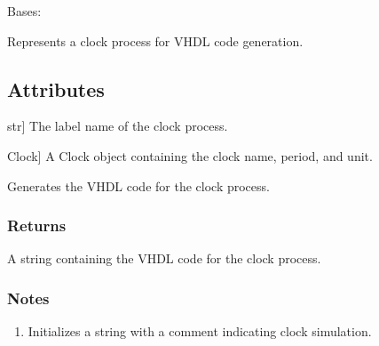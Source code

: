 \documentclass[letterpaper,10pt,english]{sphinxmanual}
\begin{document}
\begin{fulllineitems}
\label{\detokenize{process:process.Clock_Process}}
\pysigstartsignatures
{}
\pysigstopsignatures
\sphinxAtStartPar
Bases: {\hyperref[\detokenize{process:process.Process}]{}}

\sphinxAtStartPar
Represents a clock process for VHDL code generation.


\subsection{Attributes}
\label{\detokenize{process:attributes}}\begin{description}
\sphinxlineitem{label}{[}str{]}
\sphinxAtStartPar
The label name of the clock process.

\sphinxlineitem{clock}{[}Clock{]}
\sphinxAtStartPar
A Clock object containing the clock name, period, and unit.

\end{description}

\begin{fulllineitems}
\label{\detokenize{process:process.Clock_Process.process_to_vhdl}}
\pysigstartsignatures
{}
\pysigstopsignatures
\sphinxAtStartPar
Generates the VHDL code for the clock process.


\subsubsection{Returns}
\label{\detokenize{process:returns}}\begin{description}
\sphinxAtStartPar
A string containing the VHDL code for the clock process.

\end{description}


\subsubsection{Notes}
\label{\detokenize{process:notes}}\begin{description}
\begin{enumerate}
%
\item {} 
\sphinxAtStartPar
Initializes a string  with a comment indicating clock simulation.


\end{enumerate}
\end{description}
\end{fulllineitems}
\end{fulllineitems}
\end{document}
